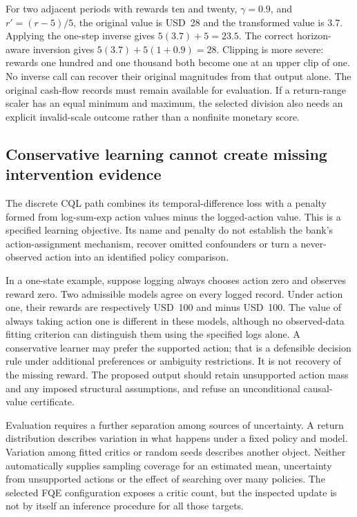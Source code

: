 For two adjacent periods with rewards ten and twenty, \(\gamma=0.9\), and
\(r'=(r-5)/5\), the original value is USD~28 and the transformed value is
3.7. Applying the one-step inverse gives \(5(3.7)+5=23.5\). The correct
horizon-aware inversion gives \(5(3.7)+5(1+0.9)=28\). Clipping is more
severe: rewards one hundred and one thousand both become one at an upper
clip of one. No inverse call can recover their original magnitudes from that
output alone. The original cash-flow records must remain available for
evaluation. If a return-range scaler has an equal minimum and maximum, the
selected division also needs an explicit invalid-scale outcome rather than a
nonfinite monetary score. \citep{exec15_d3rlpy_value,exec15_d3rlpy_exact}

\subsection{Conservative learning cannot create missing intervention evidence}

The discrete CQL path combines its temporal-difference loss with a penalty
formed from log-sum-exp action values minus the logged-action value. This is
a specified learning objective. Its name and penalty do not establish the
bank's action-assignment mechanism, recover omitted confounders or turn a
never-observed action into an identified policy comparison.
\citep{exec15_d3rlpy_value}

In a one-state example, suppose logging always chooses action zero and
observes reward zero. Two admissible models agree on every logged record.
Under action one, their rewards are respectively USD~100 and minus USD~100.
The value of always taking action one is different in these models, although
no observed-data fitting criterion can distinguish them using the specified
logs alone. A conservative learner may prefer the supported action; that is
a defensible decision rule under additional preferences or ambiguity
restrictions. It is not recovery of the missing reward. The proposed output
should retain unsupported action mass and any imposed structural assumptions,
and refuse an unconditional causal-value certificate.
\citep{exec15_d3rlpy_exact,exec15_d3rlpy_contract}

Evaluation requires a further separation among sources of uncertainty. A
return distribution describes variation in what happens under a fixed policy
and model. Variation among fitted critics or random seeds describes another
object. Neither automatically supplies sampling coverage for an estimated
mean, uncertainty from unsupported actions or the effect of searching over
many policies. The selected FQE configuration exposes a critic count, but the
inspected update is not by itself an inference procedure for all those
targets. \citep{exec15_d3rlpy_value,exec15_d3rlpy_contract}

